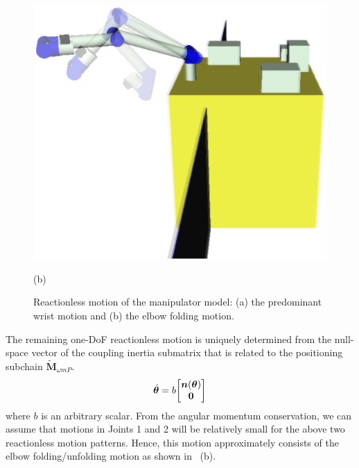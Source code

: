 \begin{figure}[t]
\begin{minipage}[h]{0.4\linewidth}
    \includegraphics[width=1.0\linewidth]{fig/chapter4/spatial/PS.eps}
    \footnotesize\par{(b)}
  \end{minipage}
  \caption{Reactionless motion of the manipulator model: (a) the predominant wrist motion and (b) the elbow folding motion.}
  \label{fig:motion}
\end{figure}
%

The remaining one-DoF reactionless motion is uniquely determined from the null-space vector
of the coupling inertia submatrix that is related to the positioning subchain $\tilde{\bm{M}}_{\omega mP}$.
%
\begin{align}
  {\dot{\bm{\theta}}} = b {\begin{bmatrix} \bm{n}({\bm{\theta}}) \\ \bm{0} \end{bmatrix}}
\end{align}
%
where $b$ is an arbitrary scalar.
From the angular momentum conservation, we can assume that motions in Joints 1 and 2 will be
relatively small for  the above two reactionless motion patterns.
Hence, this motion approximately consists of the elbow folding/unfolding motion as shown in ~(b).

